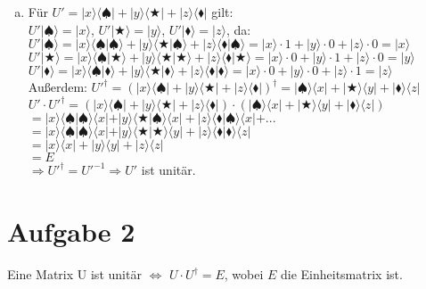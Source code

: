 \documentclass[a4paper]{scrartcl}
\begin{document}
\begin{enumerate}[a)]
\item Für $U'=|x\rangle\langle\spadesuit|+|y\rangle\langle\bigstar|+|z\rangle\langle\blacklozenge|$ gilt:\\
$U'|\spadesuit\rangle=|x\rangle$, $U'|\bigstar\rangle=|y\rangle$, $U'|\blacklozenge\rangle=|z\rangle$, da:\\
$U'|\spadesuit\rangle=|x\rangle\langle\spadesuit|\spadesuit\rangle+|y\rangle\langle\bigstar|\spadesuit\rangle+|z\rangle\langle\blacklozenge|\spadesuit\rangle = |x\rangle\cdot 1+|y\rangle\cdot 0+|z\rangle\cdot 0=|x\rangle$\\
$U'|\bigstar\rangle=|x\rangle\langle\spadesuit|\bigstar\rangle+|y\rangle\langle\bigstar|\bigstar\rangle+|z\rangle\langle\blacklozenge|\bigstar\rangle = |x\rangle\cdot 0+|y\rangle\cdot 1+|z\rangle\cdot 0=|y\rangle$\\
$U'|\blacklozenge\rangle=|x\rangle\langle\spadesuit|\blacklozenge\rangle+|y\rangle\langle\bigstar|\blacklozenge\rangle+|z\rangle\langle\blacklozenge|\blacklozenge\rangle = |x\rangle\cdot 0+|y\rangle\cdot 0+|z\rangle\cdot 1=|z\rangle$\\
Außerdem: $U'^{\dagger}=(|x\rangle\langle\spadesuit|+|y\rangle\langle\bigstar|+|z\rangle\langle\blacklozenge|)^{\dagger}=|\spadesuit\rangle\langle x|+|\bigstar\rangle\langle y|+|\blacklozenge\rangle\langle z|$\\
$U'\cdot U'^{\dagger}=(|x\rangle\langle\spadesuit|+|y\rangle\langle\bigstar|+|z\rangle\langle\blacklozenge|)\cdot(|\spadesuit\rangle\langle x|+|\bigstar\rangle\langle y|+|\blacklozenge\rangle\langle z|)$\\
$=|x\rangle\langle\spadesuit|\spadesuit\rangle\langle x|+|y\rangle\langle\bigstar|\spadesuit\rangle\langle x|+|z\rangle\langle\blacklozenge|\spadesuit\rangle\langle x|+...$\\
$=|x\rangle\langle\spadesuit|\spadesuit\rangle\langle x|+|y\rangle\langle\bigstar|\bigstar\rangle\langle y|+|z\rangle\langle\blacklozenge|\blacklozenge\rangle\langle z|$\\
$=|x\rangle\langle x|+|y\rangle\langle y|+|z\rangle\langle z|$\\
$=E$\\
$\Rightarrow U'^{\dagger} = U'^{-1} \Rightarrow U'$ ist unitär.

\end{enumerate}
\newpage
\section*{Aufgabe 2}
Eine Matrix U ist unitär $\Leftrightarrow$ $U\cdot U^{\dagger}=E$, wobei $E$ die Einheitsmatrix ist.\\\\
\end{document}
